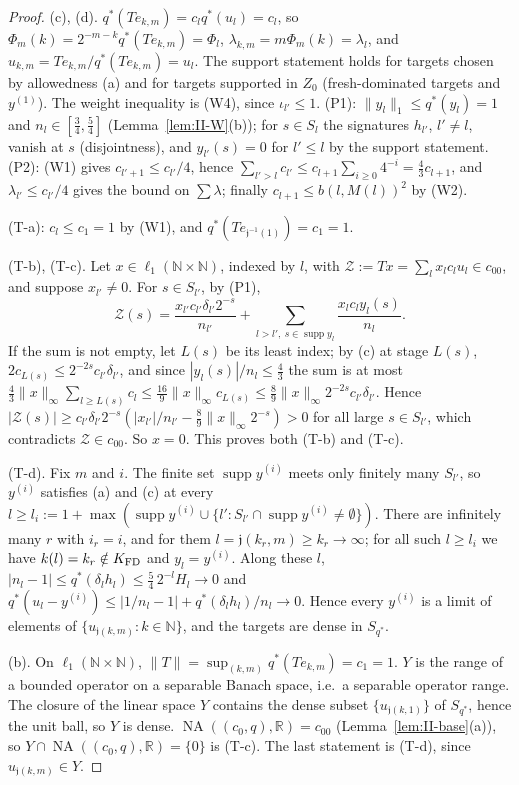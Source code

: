 \documentclass[10pt]{amsart}
\theoremstyle{definition}
\theoremstyle{remark}
\newcommand{\NA}{\operatorname{NA}}
\newcommand{\supp}{\operatorname{supp}}
\newcommand{\R}{\mathbb R}
\newcommand{\N}{\mathbb N}
\begin{document}
\begin{proof}
(c), (d).  $q^*(Te_{k,m})=c_lq^*(u_l)=c_l$, so
$\Phi_m(k)=2^{-m-k}q^*(Te_{k,m})=\Phi_l$, $\lambda_{k,m}=m\Phi_m(k)=
\lambda_l$, and $u_{k,m}=Te_{k,m}/q^*(Te_{k,m})=u_l$.  The support
statement holds for targets chosen by allowedness (a) and for targets
supported in $Z_0$ (fresh-dominated targets and $y^{(1)}$).  The weight
inequality is (W4), since $\iota_{l'}\le1$.  (P1): $\|y_l\|_1\le q^*(y_l)=
1$ and $n_l\in[\frac34,\frac54]$ (Lemma~\ref{lem:II-W}(b)); for $s\in S_l$
the signatures $h_{l'}$, $l'\ne l$, vanish at $s$ (disjointness), and
$y_{l'}(s)=0$ for $l'\le l$ by the support statement.  (P2): (W1) gives
$c_{l'+1}\le c_{l'}/4$, hence $\sum_{l'>l}c_{l'}\le c_{l+1}\sum_{i\ge0}
4^{-i}=\frac43c_{l+1}$, and $\lambda_{l'}\le c_{l'}/4$ gives the bound on
$\sum\lambda$; finally $c_{l+1}\le b(l,M(l))^2$ by (W2).

(T-a): $c_l\le c_1=1$ by (W1), and $q^*(Te_{\mathfrak j^{-1}(1)})=c_1=1$.

(T-b), (T-c).  Let $x\in\ell_1(\N\times\N)$, indexed by $l$, with
$\mathcal Z:=Tx=\sum_lx_lc_lu_l\in c_{00}$, and suppose $x_{l'}\ne0$.
For $s\in S_{l'}$, by (P1),
\[
 \mathcal Z(s)=\frac{x_{l'}c_{l'}\delta_{l'}2^{-s}}{n_{l'}}+
 \sum_{l>l',\ s\in\supp y_l}\frac{x_lc_ly_l(s)}{n_l}.
\]
If the sum is not empty, let $L(s)$ be its least index; by (c) at stage
$L(s)$, $2c_{L(s)}\le2^{-2s}c_{l'}\delta_{l'}$, and since
$|y_l(s)|/n_l\le\frac43$ the sum is at most
$\frac43\|x\|_\infty\sum_{l\ge L(s)}c_l\le\frac{16}9\|x\|_\infty
c_{L(s)}\le\frac89\|x\|_\infty2^{-2s}c_{l'}\delta_{l'}$.  Hence
$|\mathcal Z(s)|\ge c_{l'}\delta_{l'}2^{-s}(|x_{l'}|/n_{l'}-\frac89
\|x\|_\infty2^{-s})>0$ for all large $s\in S_{l'}$, which contradicts
$\mathcal Z\in c_{00}$.  So $x=0$.  This proves both (T-b) and (T-c).

(T-d).  Fix $m$ and $i$.  The finite set $\supp y^{(i)}$ meets only
finitely many $S_{l'}$, so $y^{(i)}$ satisfies (a) and (c) at every
$l\ge l_i:=1+\max(\supp y^{(i)}\cup\{l':S_{l'}\cap\supp y^{(i)}\ne
\emptyset\})$.  There are infinitely many $r$ with $i_r=i$, and for them
$l=\mathfrak j(k_r,m)\ge k_r\to\infty$; for all such $l\ge l_i$ we have
$k(l)=k_r\notin K_{\rm FD}$ and $y_l=y^{(i)}$.  Along these $l$,
$|n_l-1|\le q^*(\delta_lh_l)\le\frac54\,2^{-l}H_l\to0$ and
$q^*(u_l-y^{(i)})\le|1/n_l-1|+q^*(\delta_lh_l)/n_l\to0$.  Hence every
$y^{(i)}$ is a limit of elements of $\{u_{\mathfrak j(k,m)}:k\in\N\}$, and
the targets are dense in $S_{q^*}$.

(b).  On $\ell_1(\N\times\N)$, $\|T\|=\sup_{(k,m)}q^*(Te_{k,m})=c_1=1$.
$Y$ is the range of a bounded operator on a separable Banach space, i.e.\
a separable operator range.  The closure of the linear space $Y$ contains
the dense subset $\{u_{\mathfrak j(k,1)}\}$ of $S_{q^*}$, hence the unit
ball, so $Y$ is dense.  $\NA((c_0,q),\R)=c_{00}$
(Lemma~\ref{lem:II-base}(a)), so $Y\cap\NA((c_0,q),\R)=\{0\}$ is (T-c).
The last statement is (T-d), since $u_{\mathfrak j(k,m)}\in Y$.
\end{proof}
\end{document}
